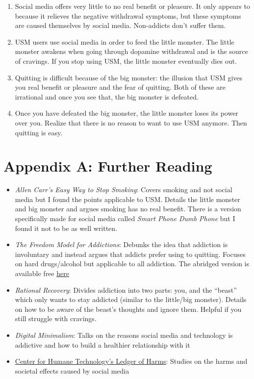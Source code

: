 \documentclass[
]{book}
\providecommand{\tightlist}{%
  \setlength{\itemsep}{0pt}\setlength{\parskip}{0pt}}
\begin{document}
\begin{enumerate}
\def\labelenumi{\arabic{enumi}.}
\tightlist
\item
  Social media offers very little to no real benefit or pleasure. It only appears to because it relieves the negative withdrawal symptoms, but these symptoms are caused themselves by social media. Non-addicts don't suffer them.
\item
  USM users use social media in order to feed the little monster. The little monster awakens when going through dopamine withdrawal and is the source of cravings. If you stop using USM, the little monster eventually dies out.
\item
  Quitting is difficult because of the big monster: the illusion that USM gives you real benefit or pleasure and the fear of quitting. Both of these are irrational and once you see that, the big monster is defeated.
\item
  Once you have defeated the big monster, the little monster loses its power over you. Realize that there is no reason to want to use USM anymore. Then quitting is easy.
\end{enumerate}

\appendix


\chapter{Appendix A: Further Reading}\label{appendix-a-further-reading}

\begin{itemize}
\tightlist
\item
  \emph{Allen Carr's Easy Way to Stop Smoking}: Covers smoking and not social media but I found the points applicable to USM. Details the little monster and big monster and argues smoking has no real benefit. There is a version specifically made for social media called \emph{Smart Phone Dumb Phone} but I found it not to be as well written.
\item
  \emph{The Freedom Model for Addictions}: Debunks the idea that addiction is involuntary and instead argues that addicts prefer using to quitting. Focuses on hard drugs/alcohol but applicable to all addiction. The abridged version is available free \href{https://archive.org/details/freedom-model-abridged/Freedom\%20Model\%20Abridged/}{here}
\item
  \emph{Rational Recovery}: Divides addiction into two parts: you, and the ``beast'' which only wants to stay addicted (similar to the little/big monster). Details on how to be aware of the beast's thoughts and ignore them. Helpful if you still struggle with cravings.
\item
  \emph{Digital Minimalism}: Talks on the reasons social media and technology is addictive and how to build a healthier relationship with it
\item
  \href{https://ledger.humanetech.com/}{Center for Humane Technology's Ledger of Harms}: Studies on the harms and societal effects caused by social media
\end{itemize}
\end{document}
